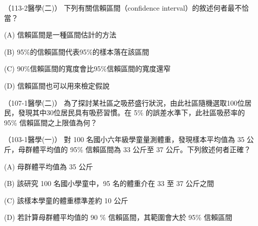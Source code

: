     \begin{docexam}{（113-2醫學(二)）}
        下列有關信賴區間（confidence interval）的敘述何者最不恰當？

        (A) 信賴區間是一種區間估計的方法

        (B) 95\%的信賴區間代表95\%的樣本落在該區間

        (C) 90\%信賴區間的寬度會比95\%信賴區間的寬度還窄

        (D) 信賴區間也可以用來檢定假說
    \end{docexam}

    \begin{docexam}{（107-1醫學(二)）}
        為了探討某社區之吸菸盛行狀況，由此社區隨機選取100位居民，發現其中30位居民具有吸菸習慣。在 5\% 的誤差水準下，此社區吸菸率的 95\% 信賴區間之上限值為何？
    \end{docexam}

    \begin{docexam}{（103-1醫學(一)）}
        對 100 名國小六年級學童量測體重，發現樣本平均值為 35 公斤，母群體平均值的 95\% 信賴區間為 33 公斤至 37 公斤。下列敘述何者正確？

        (A) 母群體平均值為 35 公斤

        (B) 該研究 100 名國小學童中，95 名的體重介在 33 至 37 公斤之間

        (C) 該樣本學童的體重標準差約 10 公斤

        (D) 若計算母群體平均值的 90 \% 信賴區間，其範圍會大於 95\% 信賴區間
    \end{docexam}

